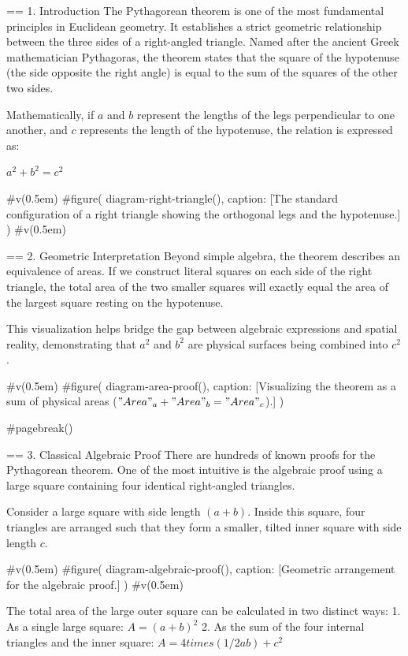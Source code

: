 == 1. Introduction
The Pythagorean theorem is one of the most fundamental principles in Euclidean geometry. It establishes a strict geometric relationship between the three sides of a right-angled triangle. Named after the ancient Greek mathematician Pythagoras, the theorem states that the square of the hypotenuse (the side opposite the right angle) is equal to the sum of the squares of the other two sides.

Mathematically, if $a$ and $b$ represent the lengths of the legs perpendicular to one another, and $c$ represents the length of the hypotenuse, the relation is expressed as:

$ a^2 + b^2 = c^2 $

#v(0.5em)
#figure(
  diagram-right-triangle(),
  caption: [The standard configuration of a right triangle showing the orthogonal legs and the hypotenuse.]
)
#v(0.5em)

== 2. Geometric Interpretation
Beyond simple algebra, the theorem describes an equivalence of areas. If we construct literal squares on each side of the right triangle, the total area of the two smaller squares will exactly equal the area of the largest square resting on the hypotenuse.

This visualization helps bridge the gap between algebraic expressions and spatial reality, demonstrating that $a^2$ and $b^2$ are physical surfaces being combined into $c^2$.

#v(0.5em)
#figure(
  diagram-area-proof(),
  caption: [Visualizing the theorem as a sum of physical areas ($"Area"_a + "Area"_b = "Area"_c$).]
)

#pagebreak() 

== 3. Classical Algebraic Proof
There are hundreds of known proofs for the Pythagorean theorem. One of the most intuitive is the algebraic proof using a large square containing four identical right-angled triangles.

Consider a large square with side length $(a + b)$. Inside this square, four triangles are arranged such that they form a smaller, tilted inner square with side length $c$.

#v(0.5em)
#figure(
  diagram-algebraic-proof(),
  caption: [Geometric arrangement for the algebraic proof.]
)
#v(0.5em)

The total area of the large outer square can be calculated in two distinct ways:
1. As a single large square: $A = (a + b)^2$
2. As the sum of the four internal triangles and the inner square: $A = 4 times (1/2 a b) + c^2$


